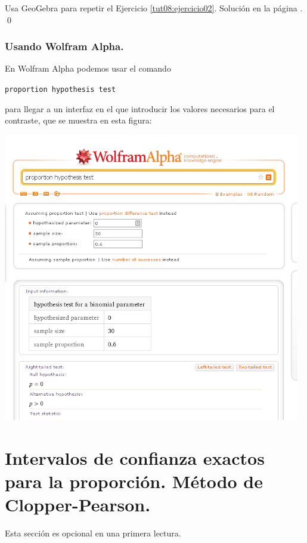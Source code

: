 \documentclass[10pt,a4paper]{article}\usepackage[]{graphicx}\usepackage[]{color}
\newcounter {cont01}
\begin{document}
\begin{ejercicio}
\label{tut08:ejercicio03}
Usa GeoGebra para repetir el Ejercicio \ref{tut08:ejercicio02}. Solución en la página \pageref{tut08:ejercicio03:sol}.
\qed
\end{ejercicio}


\subsubsection*{Usando Wolfram Alpha.}

En Wolfram Alpha podemos usar el comando

{\tt proportion hypothesis test}

para llegar a un interfaz en el que introducir los valores necesarios para el contraste, que se muestra en esta figura:
\begin{center}
    \includegraphics[width=13cm]{../fig/Tut08-07.png}
\end{center}


\section{Intervalos de confianza exactos para la proporción. Método de Clopper-Pearson.}
\label{tut08:sec:MetodoExactoBinomial}
 Esta sección es opcional en una primera lectura.\\
\end{document}
